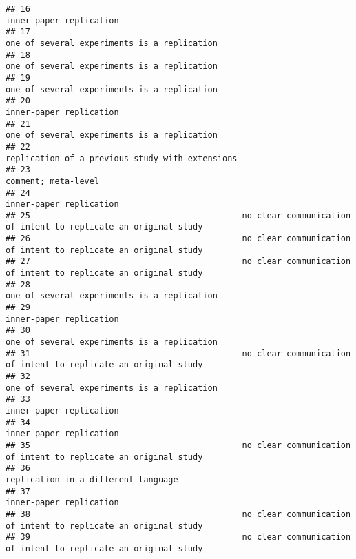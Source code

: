 \documentclass[
  english,
  man]{apa6}
\begin{document}
\begin{verbatim}
## 16                                                                                   inner-paper replication
## 17                                                               one of several experiments is a replication
## 18                                                               one of several experiments is a replication
## 19                                                               one of several experiments is a replication
## 20                                                                                   inner-paper replication
## 21                                                               one of several experiments is a replication
## 22                                                           replication of a previous study with extensions
## 23                                                                                       comment; meta-level
## 24                                                                                   inner-paper replication
## 25                                           no clear communication of intent to replicate an original study
## 26                                           no clear communication of intent to replicate an original study
## 27                                           no clear communication of intent to replicate an original study
## 28                                                               one of several experiments is a replication
## 29                                                                                   inner-paper replication
## 30                                                               one of several experiments is a replication
## 31                                           no clear communication of intent to replicate an original study
## 32                                                               one of several experiments is a replication
## 33                                                                                   inner-paper replication
## 34                                                                                   inner-paper replication
## 35                                           no clear communication of intent to replicate an original study
## 36                                                                       replication in a different language
## 37                                                                                   inner-paper replication
## 38                                           no clear communication of intent to replicate an original study
## 39                                           no clear communication of intent to replicate an original study

\end{verbatim}
\end{document}
